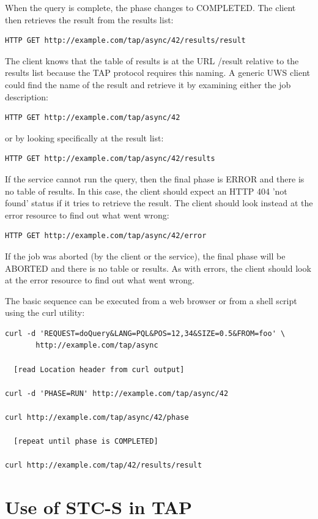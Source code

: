 \documentclass[11pt,a4paper]{ivoa}
\begin{document}
When the query is complete, the phase changes to COMPLETED. The client then 
retrieves the result from the results list:
\begin{verbatim}
HTTP GET http://example.com/tap/async/42/results/result
\end{verbatim}
The client knows that the table of results is at the URL /result relative to the 
results list because the TAP protocol requires this naming. A generic UWS client 
could find the name of the result and retrieve it by examining either the job 
description:
\begin{verbatim}
HTTP GET http://example.com/tap/async/42
\end{verbatim}
or by looking specifically at the result list:
\begin{verbatim}
HTTP GET http://example.com/tap/async/42/results
\end{verbatim}
If the service cannot run the query, then the final phase is ERROR and there is 
no table of results. In this case, the client should expect an HTTP 404 'not 
found' status if it tries to retrieve the result. The client should look instead 
at the error resource to find out what went wrong:
\begin{verbatim}
HTTP GET http://example.com/tap/async/42/error
\end{verbatim}
If the job was aborted (by the client or the service), the final phase will be 
ABORTED and there is no table or results. As with errors, the client should look 
at the error resource to find out what went wrong.

The basic sequence can be executed from a web browser or from a shell script 
using the curl utility:
\begin{verbatim}
curl -d 'REQUEST=doQuery&LANG=PQL&POS=12,34&SIZE=0.5&FROM=foo' \
       http://example.com/tap/async

  [read Location header from curl output]

curl -d 'PHASE=RUN' http://example.com/tap/async/42

curl http://example.com/tap/async/42/phase

  [repeat until phase is COMPLETED]

curl http://example.com/tap/42/results/result
\end{verbatim}

\section{Use of STC-S in TAP}
\end{document}
